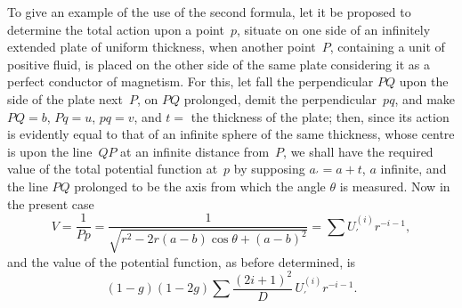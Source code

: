 \documentclass[11pt,notitlepage]{amsart}
\begin{document}
To give an example of the use of the second formula, let it be proposed
to determine the total action upon a point~$p$,
situate on one side of an infinitely
extended plate of uniform thickness, when another point~$P$, containing a unit
of positive fluid, is placed on the other side of the same plate
considering it as
a perfect conductor of magnetism. For this,
let fall the perpendicular $PQ$ upon
the side of the plate next~$P$, on $PQ$ prolonged,
demit the perpendicular~$pq$,
and make $PQ=b$, $Pq=u$, $pq=v$, and $t=$ the thickness of the plate;
then, since its action is evidently equal to that of an infinite sphere of the
same thickness, whose centre is upon the line~$QP$ at an infinite distance
from~$P$, we shall have the required value
of the total potential function at~$p$
by supposing $a_\prime=a+t$, $a$ infinite,
and the line $PQ$ prolonged to be the
axis from which the angle $\theta$ is measured. Now in the present case
\[
V=\frac{1}{Pp}
=\frac{1}{\sqrt{r^2-2r(a-b)\cos\theta+(a-b)^2}}
=\sum U_\prime^{(i)}r^{-i-1},
\]
and the value of the potential function, as before determined, is
\[
(1-g)(1-2g)\sum\frac{(2i+1)^2}{D}\,U_\prime^{(i)}r^{-i-1}.
\]
\end{document}
